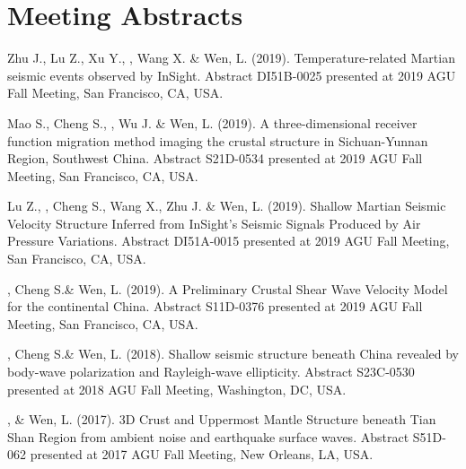 \section*{Meeting Abstracts}
\begin{etaremune}
\item
    Zhu J., Lu Z., Xu Y., \Xiao, Wang X. \& Wen, L. (2019).
    Temperature-related Martian seismic events observed by InSight.
    Abstract DI51B-0025 presented at 2019 AGU Fall Meeting, San Francisco, CA, USA.
\item
    Mao S., Cheng S., \Xiao, Wu J. \& Wen, L. (2019).
    A three-dimensional receiver function migration method imaging the crustal structure in Sichuan-Yunnan Region, Southwest China. 
    Abstract S21D-0534 presented at 2019 AGU Fall Meeting, San Francisco, CA, USA.
\item
    Lu Z., \Xiao, Cheng S., Wang X., Zhu J. \& Wen, L. (2019).
    Shallow Martian Seismic Velocity Structure Inferred from InSight's Seismic Signals Produced by Air Pressure Variations. 
    Abstract DI51A-0015 presented at 2019 AGU Fall Meeting, San Francisco, CA, USA.
\item
    \Xiao, Cheng S.\& Wen, L. (2019).
    A Preliminary Crustal Shear Wave Velocity Model for the continental China. 
    Abstract S11D-0376 presented at 2019 AGU Fall Meeting, San Francisco, CA, USA.

\item
    \Xiao, Cheng S.\& Wen, L. (2018).
    Shallow seismic structure beneath China revealed by body-wave polarization and Rayleigh-wave ellipticity. 
    Abstract S23C-0530 presented at 2018 AGU Fall Meeting, Washington, DC, USA.
\item
    \Xiao, \& Wen, L. (2017).
    3D Crust and Uppermost Mantle Structure beneath Tian Shan Region from ambient noise and earthquake surface waves. 
    Abstract S51D-062 presented at 2017 AGU Fall Meeting, New Orleans, LA, USA.
\end{etaremune}
